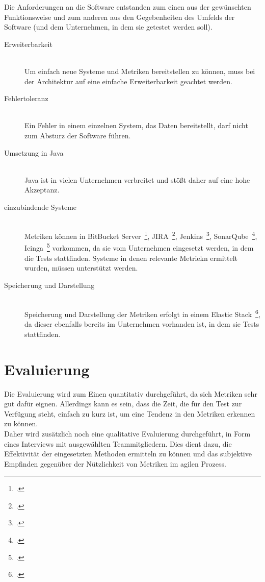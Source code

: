Die Anforderungen an die Software entstanden zum einen aus der gewünschten Funktionsweise und zum anderen aus den Gegebenheiten des Umfelds der Software (und dem Unternehmen, in dem sie getestet werden soll).

\begin{description}
    \item[Erweiterbarkeit] \hfill \\ Um einfach neue Systeme und Metriken bereitstellen zu können, muss bei der Architektur auf eine einfache Erweiterbarkeit geachtet werden.
    \item[Fehlertoleranz] \hfill \\ Ein Fehler in einem einzelnen System, das Daten bereitstellt, darf nicht zum Absturz der Software führen.
    \item[Umsetzung in Java] \hfill \\ Java ist in vielen Unternehmen verbreitet und stößt daher auf eine hohe Akzeptanz.
    \item[einzubindende Systeme] \hfill \\ Metriken können in BitBucket Server~\footcite{bitbucket_server}, JIRA~\footcite{jira}, Jenkins~\footcite{jenkins}, SonarQube~\footcite{sonarqube}, Icinga~\footcite{icinga} vorkommen, da sie vom Unternehmen eingesetzt werden, in dem die Tests stattfinden. Systeme in denen relevante Metriekn ermittelt wurden, müssen unterstützt werden.
    \item[Speicherung und Darstellung] \hfill \\ Speicherung und Darstellung der Metriken erfolgt in einem Elastic Stack~\footcite{elastic_stack}, da dieser ebenfalls bereits im Unternehmen vorhanden ist, in dem sie Tests stattfinden.
\end{description}

\clearpage
\section{Evaluierung}

Die Evaluierung wird zum Einen quantitativ durchgeführt, da sich Metriken sehr gut dafür eignen.
Allerdings kann es sein, dass die Zeit, die für den Test zur Verfügung steht, einfach zu kurz ist, um eine Tendenz in den Metriken erkennen zu können.
\\
Daher wird zusätzlich noch eine qualitative Evaluierung durchgeführt, in Form eines Interviews mit ausgewählten Teammitgliedern.
Dies dient dazu, die Effektivität der eingesetzten Methoden ermitteln zu können und das subjektive Empfinden gegenüber der Nützlichkeit von Metriken im agilen Prozess.
